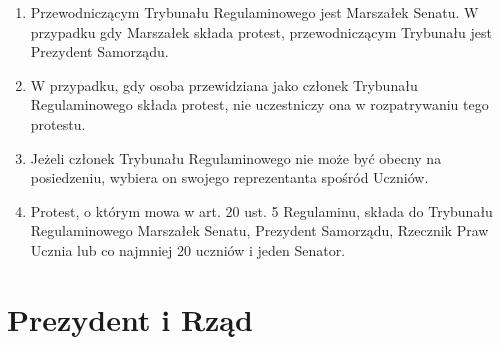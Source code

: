 \documentclass[14pt]{article}
\newenvironment{ustepy}{%
	\begin{enumerate}[leftmargin=1.5em, itemindent=1pt, labelwidth=1em, itemsep=5pt]
	}{%
	\end{enumerate}
}
\begin{document}
\begin{ustepy}
	\item Przewodniczącym Trybunału Regulaminowego jest Marszałek Senatu. W przypadku gdy Marszałek składa protest, przewodniczącym Trybunału jest Prezydent Samorządu.
	\item W przypadku, gdy osoba przewidziana jako członek Trybunału Regulaminowego składa protest, nie uczestniczy ona w rozpatrywaniu tego protestu.
	\item Jeżeli członek Trybunału Regulaminowego nie może być obecny na posiedzeniu, wybiera on swojego reprezentanta spośród Uczniów.
	\item Protest, o którym mowa w art. 20 ust. 5 Regulaminu, składa do Trybunału Regulaminowego Marszałek Senatu, Prezydent Samorządu, Rzecznik Praw Ucznia lub co najmniej 20 uczniów i jeden Senator.
\end{ustepy}
\newpage
\section{Prezydent i Rząd}
\end{document}
